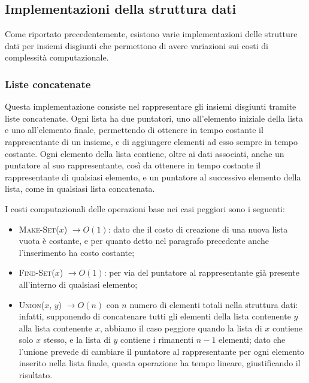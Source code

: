 
\subsection{Implementazioni della struttura dati}
Come riportato precedentemente, esistono varie implementazioni delle strutture
dati per insiemi disgiunti che permettono di avere variazioni sui costi di complessità
computazionale.

\subsubsection{Liste concatenate}
Questa implementazione consiste nel rappresentare gli insiemi disgiunti tramite liste
concatenate. Ogni lista ha due puntatori, uno all'elemento iniziale della lista e uno
all'elemento finale, permettendo di ottenere in tempo costante il rappresentante di un
insieme, e di aggiungere elementi ad esso sempre in tempo costante. Ogni elemento della
lista contiene, oltre ai dati associati, anche un puntatore al suo rappresentante, così da
ottenere in tempo costante il rappresentante di qualsiasi elemento, e un puntatore al
successivo elemento della lista, come in qualsiasi lista concatenata.\newline

I costi computazionali delle operazioni base nei casi peggiori sono i seguenti:
\begin{itemize}
    \item \textsc{Make-Set($x$)} $\rightarrow O(1)$: dato che il costo di creazione di una nuova lista vuota è costante,
          e per quanto detto nel paragrafo precedente anche l'inserimento ha costo costante;
    \item \textsc{Find-Set($x$)} $\rightarrow O(1)$: per via del puntatore al rappresentante già presente all'interno
          di qualsiasi elemento;
    \item \textsc{Union($x$, $y$)} $\rightarrow O(n)$ con $n$ numero di elementi totali nella struttura dati: infatti,
          supponendo di concatenare tutti gli elementi della lista contenente $y$ alla lista contenente $x$, abbiamo il caso
          peggiore quando la lista di $x$ contiene solo $x$ stesso, e la lista di $y$ contiene i rimanenti $n-1$ elementi;
          dato che l'unione prevede di cambiare il puntatore al rappresentante per ogni elemento inserito nella lista finale,
          questa operazione ha tempo lineare, giustificando il risultato.
\end{itemize}

